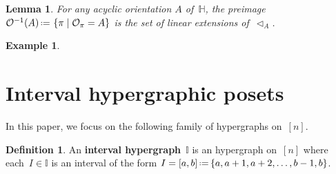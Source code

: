 \documentclass[reqno]{amsart}
\newtheorem{lemma}[theorem]{Lemma}
\theoremstyle{definition}
\newtheorem{definition}[theorem]{Definition}
\newtheorem{example}[theorem]{Example}
\newcommand{\set}[2]{\left\{ #1 \;\middle|\; #2 \right\}} %
\newcommand{\eqdef}{\mbox{\,\raisebox{0.2ex}{\scriptsize\ensuremath{\mathrm:}}\ensuremath{=}\,}} %
\newcommand{\defn}[1]{\textbf{\textsf{\color{PineGreen} #1}}} %
\newcommand{\vincent}[1]{\todo[size=\tiny,color=blue!30]{ #1 \\ \hfill --- V.}\,}
\newcommand{\less}{\vartriangleleft} %
\newcommand{\Or}{\mathcal O}  %
\newcommand{\HH}{\mathbb H}  %
\newcommand{\II}{\mathbb I} %
\begin{document}
\begin{lemma}
\label{lem:prepi}
For any acyclic orientation $A$ of~$\HH$, the preimage $\Or^{-1}(A) \eqdef \set{\pi}{\Or_\pi=A}$ is the set of linear extensions of~$\less_A$.
\end{lemma}

\begin{example}
\vincent{todo}
\end{example}




\section{Interval hypergraphic posets}
\label{sec:IHP}

In this paper, we focus on the following family of hypergraphs on~$[n]$.

\begin{definition}
An \defn{interval hypergraph}~$\II$ is an hypergraph on~$[n]$ where each~$I \in \II$ is an interval of the form $I = [a,b] \eqdef \{a, a+1, a+2, \dots, b-1, b\}$.
\end{definition}
\end{document}
